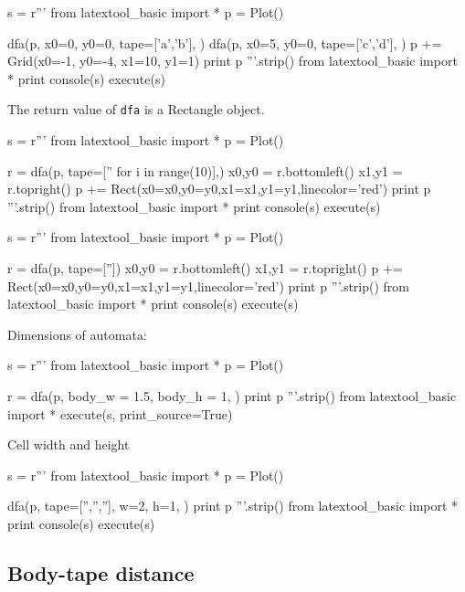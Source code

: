 \begin{python}
s = r'''
from latextool_basic import *
p = Plot()

dfa(p, x0=0, y0=0,
    tape=['a','b'],
    )
dfa(p, x0=5, y0=0,
    tape=['c','d'],
    )
p += Grid(x0=-1, y0=-4, x1=10, y1=1)
print p
'''.strip()
from latextool_basic import *
print console(s)
execute(s)
\end{python}


The return value of \verb!dfa! is a Rectangle object.

\begin{python}
s = r'''
from latextool_basic import *
p = Plot()

r = dfa(p, tape=['' for i in range(10)],)
x0,y0 = r.bottomleft()
x1,y1 = r.topright()
p += Rect(x0=x0,y0=y0,x1=x1,y1=y1,linecolor='red')
print p
'''.strip()
from latextool_basic import *
print console(s)
execute(s)
\end{python}


\begin{python}
  s = r'''
from latextool_basic import *
p = Plot()

r = dfa(p, tape=[''])
x0,y0 = r.bottomleft()
x1,y1 = r.topright()
p += Rect(x0=x0,y0=y0,x1=x1,y1=y1,linecolor='red')
print p
'''.strip()
from latextool_basic import *
print console(s)
execute(s)
\end{python}



\newpage

Dimensions of automata:

\begin{python}
s = r'''
from latextool_basic import *
p = Plot()

r = dfa(p,
    body_w = 1.5,
    body_h = 1,
    )
print p
'''.strip()
from latextool_basic import *
execute(s, print_source=True)
\end{python}


\newpage
Cell width and height
\begin{python}
s = r'''
from latextool_basic import *
p = Plot()

dfa(p,
    tape=['','',''],
    w=2, h=1,
    )
print p
'''.strip()
from latextool_basic import *
print console(s)
execute(s)
\end{python}


\newpage
\subsection{Body-tape distance}

